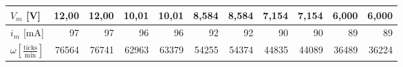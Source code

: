\begin{tabular}{l|r|r|r|r|r|r|r|r|r|r}
\( V_m\) [V] & 12,00 & 12,00 & 10,01 & 10,01 & 8,584 & 8,584 & 7,154 & 7,154 & 6,000 & 6,000\\\hline
\( i_m\) [mA] & 97 & 97 & 96 & 96 & 92 & 92 & 90 & 90 & 89 & 89\\\hline
\( \omega \left[ \frac { \text{ticks} }{ \text{min} }  \right]  \) & 76564 & 76741 & 62963 & 63379 & 54255 & 54374 & 44835 & 44089 & 36489 & 36224
\end{tabular}